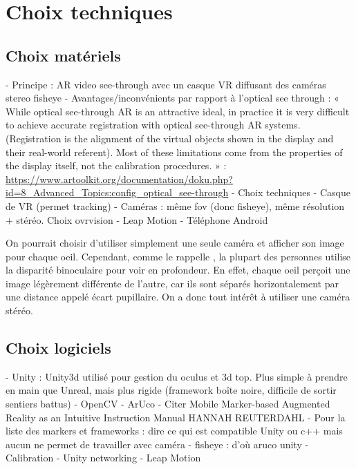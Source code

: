 

\section{Choix techniques}
\subsection{Choix matériels}
- Principe : AR video see-through avec un casque VR diffusant des caméras stereo fisheye
  - Avantages/inconvénients par rapport à l'optical see through : « While optical see-through AR is an attractive ideal, in practice it is very difficult to achieve accurate registration with optical see-through AR systems. (Registration is the alignment of the virtual objects shown in the display and their real-world referent). Most of these limitations come from the properties of the display itself, not the calibration procedures. » : \url{https://www.artoolkit.org/documentation/doku.php?id=8_Advanced_Topics:config_optical_see-through}
- Choix techniques
  - Casque de VR (permet tracking)
  - Caméras : même fov (donc fisheye), même résolution + stéréo. Choix ovrvision
  - Leap Motion
  - Téléphone Android

On pourrait choisir d'utiliser simplement une seule caméra et afficher son image pour chaque oeil. Cependant, comme le rappelle \citep{Bourke1999}, la plupart des personnes utilise la disparité binoculaire pour voir en profondeur. En effet, chaque oeil perçoit une image légèrement différente de l'autre, car ils sont séparés horizontalement par une distance appelé écart pupillaire. On a donc tout intérêt à utiliser une caméra stéréo.

\subsection{Choix logiciels}
- Unity : Unity3d utilisé pour gestion du oculus et 3d top. Plus simple à prendre en main que Unreal, mais plus rigide (framework boîte noire, difficile de sortir sentiers battus)
- OpenCV
  - ArUco
    - Citer Mobile Marker-based Augmented Reality as an Intuitive Instruction Manual HANNAH REUTERDAHL
    - Pour la liste des markers et frameworks : dire ce qui est compatible Unity ou c++ mais aucun ne permet de travailler avec caméra - fisheye : d'où aruco unity
  - Calibration
- Unity networking
- Leap Motion

